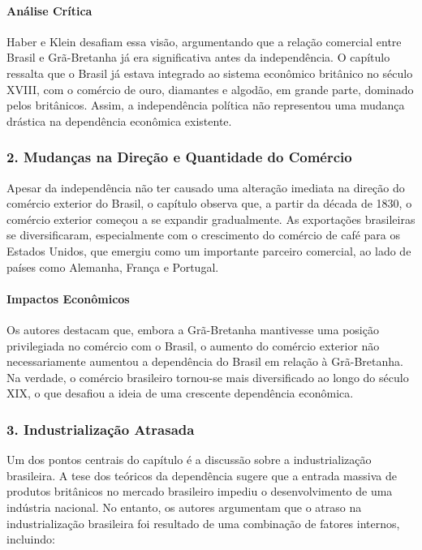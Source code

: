 \documentclass[a4paper,12pt]{article}[abntex2]
\begin{document}
\paragraph*{Análise Crítica}
Haber e Klein desafiam essa visão, argumentando que a relação comercial entre Brasil e Grã-Bretanha já era significativa antes da independência. O capítulo ressalta que o Brasil já estava integrado ao sistema econômico britânico no século XVIII, com o comércio de ouro, diamantes e algodão, em grande parte, dominado pelos britânicos. Assim, a independência política não representou uma mudança drástica na dependência econômica existente.

\subsubsection*{2. Mudanças na Direção e Quantidade do Comércio}
Apesar da independência não ter causado uma alteração imediata na direção do comércio exterior do Brasil, o capítulo observa que, a partir da década de 1830, o comércio exterior começou a se expandir gradualmente. As exportações brasileiras se diversificaram, especialmente com o crescimento do comércio de café para os Estados Unidos, que emergiu como um importante parceiro comercial, ao lado de países como Alemanha, França e Portugal.

\paragraph*{Impactos Econômicos}
Os autores destacam que, embora a Grã-Bretanha mantivesse uma posição privilegiada no comércio com o Brasil, o aumento do comércio exterior não necessariamente aumentou a dependência do Brasil em relação à Grã-Bretanha. Na verdade, o comércio brasileiro tornou-se mais diversificado ao longo do século XIX, o que desafiou a ideia de uma crescente dependência econômica.

\subsubsection*{3. Industrialização Atrasada}
Um dos pontos centrais do capítulo é a discussão sobre a industrialização brasileira. A tese dos teóricos da dependência sugere que a entrada massiva de produtos britânicos no mercado brasileiro impediu o desenvolvimento de uma indústria nacional. No entanto, os autores argumentam que o atraso na industrialização brasileira foi resultado de uma combinação de fatores internos, incluindo:
\end{document}
